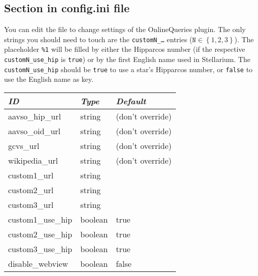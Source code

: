 \subsection{Section  in config.ini file}

You can edit the  file to change settings of the
OnlineQueries plugin.  The only strings you should need to touch are
the \texttt{customN\_\ldots} entries ($\mathtt{N}\in \left\{ 1, 2,
3\right\}$). The placeholder \texttt{\%1} will be filled by either the
Hipparcos number (if the respective \texttt{customN\_use\_hip} is
\texttt{true}) or by the first English name used in Stellarium. The
\texttt{customN\_use\_hip} should be \texttt{true} to use a star's
Hipparcos number, or \texttt{false} to use the English name as key.


\begin{center}
{\small
\begin{tabular}{l|l|l}\toprule
\emph{ID} & \emph{Type} & \emph{Default}\\\midrule
aavso\_hip\_url      &string & (don't override)\\ %
aavso\_oid\_url      &string & (don't override)\\ %
gcvs\_url            &string & (don't override)\\ %
wikipedia\_url       &string & (don't override)\\ %
\midrule
custom1\_url         &string & \\
custom2\_url         &string & \\
custom3\_url         &string & \\
custom1\_use\_hip    &boolean& true \\
custom2\_use\_hip    &boolean& true \\
custom3\_use\_hip    &boolean& true \\\midrule
disable\_webview     &boolean&false \\
\bottomrule
\end{tabular}
}
\end{center}

